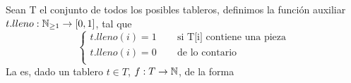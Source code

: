 \documentclass[11pt, a4paper, twoside]{article}
\begin{document}










\begin{definicion}
Sean T el conjunto de todos los posibles tableros, 
definimos la función auxiliar 
$t.lleno: \mathbb{N}_{\geq 1} \rightarrow [0,1]$, tal que
\[
  \left\lbrace
  \begin{array}{l}
     t.lleno(i) = 1 ~~~~~~~~ \text{ si T[i] contiene una pieza} \\
     t.lleno(i) = 0 ~~~~~~~~ \text{ de lo contario} \\
  \end{array}
  \right.
\]
La  es, dado un tablero $t \in T$,
$f: T \rightarrow \mathbb{N}$, de la forma
\red{
\[
f(T) := \nsum_{i=1}^{\#casilleros}{ t.lleno \bigg( {\large T\left(i\right)} \bigg) }
\]
}
\end{definicion}
\end{document}
